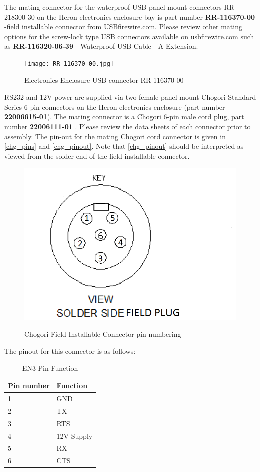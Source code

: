 \documentclass[]{clearpath-latex/clearpath-manual}
\begin{document}
The mating connector for the waterproof USB panel mount connectors RR-218300-30 on the Heron electronics enclosure bay is part number \textbf{RR-116370-00} -field installable connector from USBfirewire.com. Please review other mating options for the screw-lock type USB connectors available on usbfirewire.com such as \textbf{RR-116320-06-39} - Waterproof USB Cable - A Extension.

\begin{figure}[h]
  \centering
  \texttt{[image: RR-116370-00.jpg]}
  \label{h_usb0}
  \caption{Electronics Enclosure USB connector RR-116370-00}
\end{figure}

RS232 and 12V power are supplied via two female panel mount Chogori Standard Series 6-pin connectors on the Heron electronics enclosure (part number \textbf{22006615-01}).  The mating connector is a Chogori 6-pin male cord plug, part number \textbf{22006111-01} . Please review the data sheets of each connector prior to assembly. The pin-out for the mating Chogori cord connector is given in \autoref{chg_pins} and \autoref{chg_pinout}. Note that \autoref{chg_pinout} should be interpreted as viewed from the solder end of the field installable connector.

\begin{figure}[h]
  \centering
  \includegraphics[width=0.5\linewidth]{graphics/h-field_conn_pins.png}
  \label{chg_pins}
  \caption{Chogori Field Installable Connector pin numbering }
\end{figure}


The pinout for this connector is as follows:


\begin{table}[h]
\centering
\label{chg_pinout}
\begin{tabular}{|l|l|}
Pin number  & Function \\
\hline
1  & GND              \\ \hline
2  & TX  \\ \hline
3  & RTS  \\ \hline
4  & 12V Supply            \\ \hline
5  & RX             \\ \hline
6  & CTS            \\ \hline

\end{tabular}
\caption{EN3 Pin Function}
\end{table}
\end{document}
